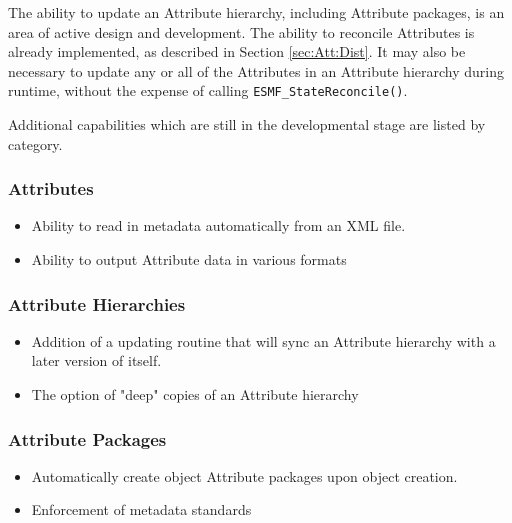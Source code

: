 %

The ability to update an Attribute hierarchy, including Attribute packages, is an area of active design and development.  The ability to reconcile Attributes is already implemented, as described in Section \ref{sec:Att:Dist}.  It may also be necessary to update any or all of the Attributes in an Attribute hierarchy during runtime, without the expense of calling {\tt ESMF\_StateReconcile()}.  

Additional capabilities which are still in the developmental stage are listed by category.
 
\subsubsection{Attributes}

\begin{itemize}
\item Ability to read in metadata automatically from an XML file.
\item Ability to output Attribute data in various formats
\end{itemize}

\subsubsection{Attribute Hierarchies}

\begin{itemize}
\item Addition of a updating routine that will sync an Attribute hierarchy with a later version of itself.
\item The option of "deep" copies of an Attribute hierarchy
\end{itemize}

\subsubsection{Attribute Packages}

\begin{itemize}
\item Automatically create object Attribute packages upon object creation.
\item Enforcement of metadata standards
\end{itemize}
